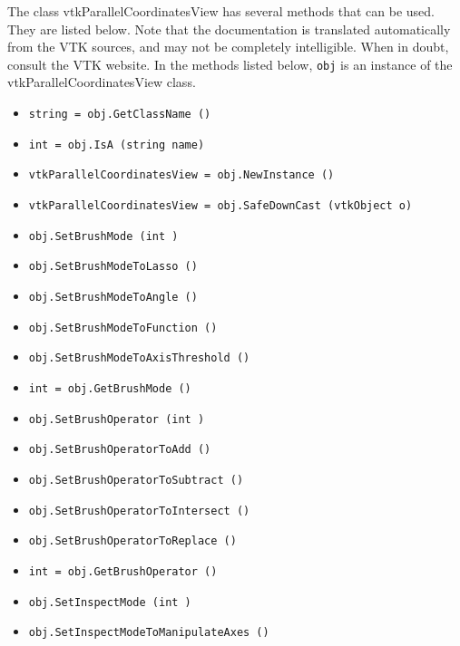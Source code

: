 The class vtkParallelCoordinatesView has several methods that can be used.
  They are listed below.
Note that the documentation is translated automatically from the VTK sources,
and may not be completely intelligible.  When in doubt, consult the VTK website.
In the methods listed below, \verb|obj| is an instance of the vtkParallelCoordinatesView class.
\begin{itemize}
\item  \verb|string = obj.GetClassName ()|

\item  \verb|int = obj.IsA (string name)|

\item  \verb|vtkParallelCoordinatesView = obj.NewInstance ()|

\item  \verb|vtkParallelCoordinatesView = obj.SafeDownCast (vtkObject o)|

\item  \verb|obj.SetBrushMode (int )|

\item  \verb|obj.SetBrushModeToLasso ()|

\item  \verb|obj.SetBrushModeToAngle ()|

\item  \verb|obj.SetBrushModeToFunction ()|

\item  \verb|obj.SetBrushModeToAxisThreshold ()|

\item  \verb|int = obj.GetBrushMode ()|

\item  \verb|obj.SetBrushOperator (int )|

\item  \verb|obj.SetBrushOperatorToAdd ()|

\item  \verb|obj.SetBrushOperatorToSubtract ()|

\item  \verb|obj.SetBrushOperatorToIntersect ()|

\item  \verb|obj.SetBrushOperatorToReplace ()|

\item  \verb|int = obj.GetBrushOperator ()|

\item  \verb|obj.SetInspectMode (int )|

\item  \verb|obj.SetInspectModeToManipulateAxes ()|


\end{itemize}
